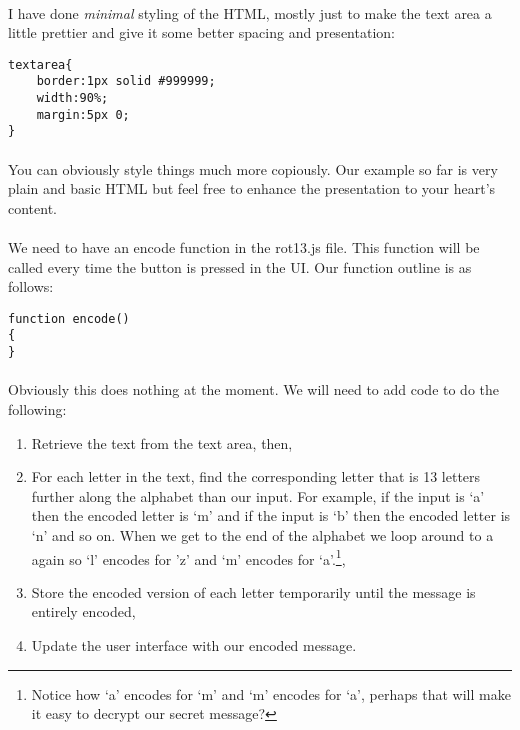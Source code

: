 \documentclass[10pt, a4paper, twosize]{article}
\begin{document}
\paragraph{} I have done \emph{minimal} styling of the HTML, mostly just to make the text area a little prettier and give it some better spacing and presentation:

\begin{lstlisting}
textarea{
    border:1px solid #999999;
    width:90%;
    margin:5px 0;
}
\end{lstlisting}

\paragraph{} You can obviously style things much more copiously. Our example so far is very plain and basic HTML but feel free to enhance the presentation to your heart's content.

\paragraph{} We need to have an encode function in the rot13.js file. This function will be called every time the button is pressed in the UI. Our function outline is as follows: 

\begin{lstlisting}
function encode() 
{ 
}
\end{lstlisting}

\paragraph{} Obviously this does nothing at the moment. We will need to add code to do the following:


\begin{enumerate}
\item Retrieve the text from the text area, then,
\item For each letter in the text, find the corresponding letter that is 13 letters further along the alphabet than our input. For example, if the input is `a' then the encoded letter is `m' and if the input is `b' then the encoded letter is `n' and so on. When we get to the end of the alphabet we loop around to a again so `l' encodes for 'z' and `m' encodes for `a'.\footnote{Notice how `a' encodes for `m' and `m' encodes for `a', perhaps that will make it easy to decrypt our secret message?},
\item Store the encoded version of each letter temporarily until the message is entirely encoded,
\item Update the user interface with our encoded message.
\end{enumerate}
\end{document}
